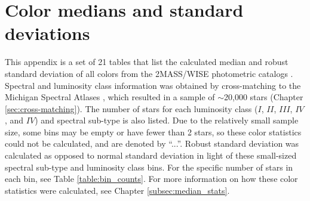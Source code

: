 \chapter{Color medians and standard deviations}\label{Appendix:2}
This appendix is a set of 21 tables that list the calculated median and robust standard deviation of all colors from the 2MASS/WISE photometric catalogs \citep{2MASS,ALLWISE}. Spectral and luminosity class information was obtained by cross-matching to the Michigan Spectral Atlases \citep{Houk1975,Houk1978,Houk1982,Houk1988,Houk1999}, which resulted in a sample of $\sim$20,000 stars (Chapter \ref{sec:cross-matching}). The number of stars for each luminosity class ($I$, $II$, $III$, $IV$, and $IV$) and spectral sub-type is also listed. Due to the relatively small sample size, some bins may be empty or have fewer than 2 stars, so these color statistics could not be calculated, and are denoted by ``...''. Robust standard deviation was calculated as opposed to normal standard deviation in light of these small-sized spectral sub-type and luminosity class bins. For the specific number of stars in each bin, see Table \ref{table:bin_counts}. For more information on how these color statistics were calculated, see Chapter \ref{subsec:median_stats}.


